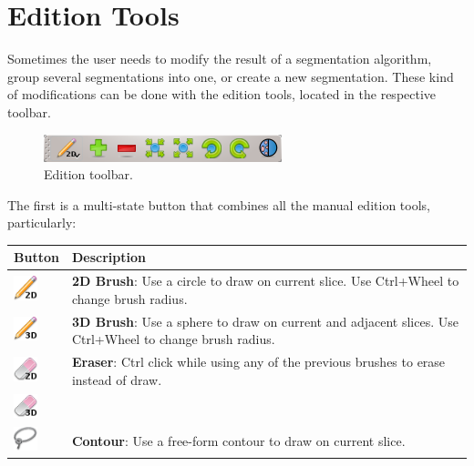 \section{Edition Tools}

Sometimes the user needs to modify the result of a segmentation algorithm, 
group several segmentations into one, or create a new segmentation. These kind
of modifications can be done with the edition tools, located in the respective
toolbar.\\

\begin{figure}[H]
\centering
\includegraphics{fig/EditorToolbar}
\caption{Edition toolbar.}
\end{figure}

The first is a multi-state button that combines all the manual edition tools,
particularly:\\

\vspace{0.1cm}
\begin{tabular}{| m{1.3cm} | m{12cm} |}
\hline
\textbf{Button} & \textbf{Description}\\
\hline
\includegraphics[width=0.7cm]{../../frontend/rsc/pencil2D} &
\textbf{2D Brush}: Use a circle to draw on current slice. Use Ctrl+Wheel to
change brush radius.\\
\hline
\includegraphics[width=0.7cm]{../../frontend/rsc/pencil3D} &
\textbf{3D Brush}: Use a sphere to draw on current and adjacent slices. Use
Ctrl+Wheel to change brush radius.\\
\hline
\includegraphics[width=0.7cm]{../../frontend/rsc/eraser2D} &
\textbf{Eraser}: Ctrl click while using any of the previous brushes to erase
instead of draw.\\
\includegraphics[width=0.7cm]{../../frontend/rsc/eraser3D} & \\
\hline
\includegraphics[width=0.7cm]{../../frontend/rsc/lasso} &
\textbf{Contour}: Use a free-form contour to draw on current slice.\\
\hline
\end{tabular}
\vspace{0.3cm}

